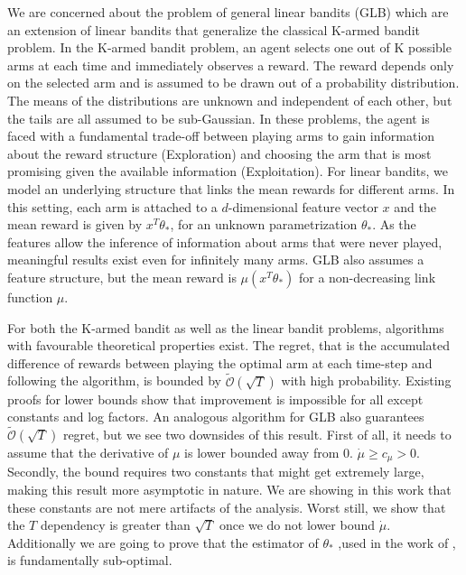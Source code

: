 \documentclass[twoside]{article} \usepackage{aistats2017}
\begin{document}
We are concerned about the problem of general linear bandits (GLB) which are an extension of linear bandits that generalize the classical K-armed bandit problem.
In the K-armed bandit problem, an agent selects one out of K possible arms at each time and immediately observes a reward.
The reward depends only on the selected arm and is assumed to be drawn out of a probability distribution. 
The means of the distributions are unknown and independent of each other, but the tails are all assumed to be sub-Gaussian.
In these problems, the agent is faced with a fundamental trade-off between playing arms to gain information about the reward structure (Exploration) and choosing the arm that is most promising given the available information (Exploitation).
For linear bandits, we model an underlying structure that links the mean rewards for different arms. 
In this setting, each arm is attached to a $d$-dimensional feature vector $x$ and the mean reward is given by $x^T\theta_*$, for an unknown parametrization $\theta_*$.
As the features allow the inference of information about arms that were never played, meaningful results exist even for infinitely many arms.
GLB also assumes a feature structure, but the mean reward is $\mu(x^T\theta_*)$ for a non-decreasing link function $\mu$.

For both the K-armed bandit as well as the linear bandit problems, algorithms with favourable theoretical properties exist. The regret, that is the accumulated difference of rewards between playing the optimal arm at each time-step and following the algorithm, is bounded by $\tilde{\mathcal{O}}(\sqrt{T})$ with high probability. 
Existing proofs for lower bounds show that improvement is impossible for all except constants and log factors.
An analogous algorithm for GLB also guarantees $\tilde{\mathcal{O}}(\sqrt{T})$ regret, but we see two downsides of this result. First of all, it needs to assume that the derivative of $\mu$ is lower bounded away from $0$. $\dot{\mu}\geq c_\mu > 0$. 
Secondly, the bound requires two constants that might get extremely large, making this result more asymptotic in nature. 
We are showing in this work that these constants are not mere artifacts of the analysis.
Worst still, we show that the $T$ dependency is greater than $\sqrt{T}$ once we do not lower bound $\dot{\mu}$.
Additionally we are going to prove that the estimator of $\theta_*$ ,used in the work of \cite{}, is fundamentally sub-optimal.
\end{document}
